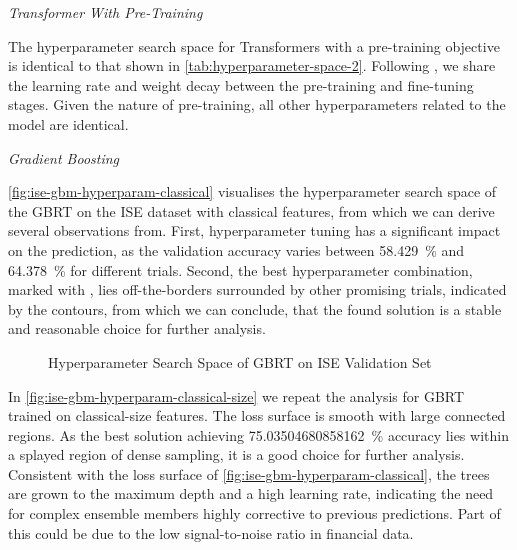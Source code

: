 \emph{Transformer With Pre-Training}

The hyperparameter search space for Transformers with a pre-training objective is identical to that shown in \cref{tab:hyperparameter-space-2}. Following \textcite[][4]{rubachevRevisitingPretrainingObjectives2022}, we share the learning rate and weight decay between the pre-training and fine-tuning stages. Given the nature of pre-training, all other hyperparameters related to the model are identical.


\emph{Gradient Boosting}

\cref{fig:ise-gbm-hyperparam-classical} visualises the hyperparameter search space of the \gls{GBRT} on the \gls{ISE} dataset with classical features, from which we can derive several observations from. First, hyperparameter tuning has a significant impact on the prediction, as the validation accuracy varies between \SI{58.429}{\percent} and \SI{64.378}{\percent} for different trials. Second, the best hyperparameter combination, marked with \bestcircle, lies off-the-borders surrounded by other promising trials, indicated by the contours, from which we can conclude, that the found solution is a stable and reasonable choice for further analysis.


\begin{figure}[!b]
    \vfill
\end{figure}
\clearpage
\begin{figure}[ht]
    \addtocounter{figure}{-1}
    \caption[]{Hyperparameter Search Space of \gls{GBRT} on \gls{ISE} Validation Set}
    \label{fig:ise-gbm-hyperparam}
\end{figure}

In \cref{fig:ise-gbm-hyperparam-classical-size} we repeat the analysis for \gls{GBRT} trained on classical-size features. The loss surface is smooth with large connected regions. As the best solution achieving \SI{75.03504680858162}{\percent} accuracy lies within a splayed region of dense sampling, it is a good choice for further analysis. Consistent with the loss surface of \cref{fig:ise-gbm-hyperparam-classical}, the trees are grown to the maximum depth and a high learning rate, indicating the need for complex ensemble members highly corrective to previous predictions. Part of this could be due to the low signal-to-noise ratio in financial data.

